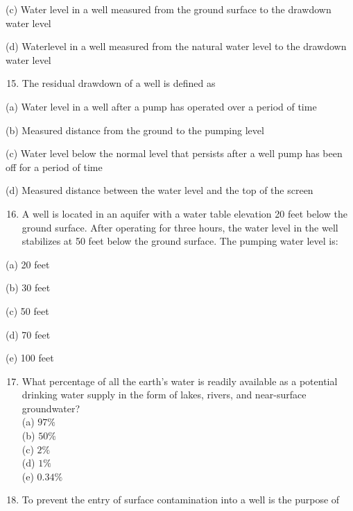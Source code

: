 \documentclass[10pt]{article}
\begin{document}
(c) Water level in a well measured from the ground surface to the drawdown water level

(d) Waterlevel in a well measured from the natural water level to the drawdown water level

\begin{enumerate}
  \setcounter{enumi}{14}
  \item The residual drawdown of a well is defined as
\end{enumerate}

(a) Water level in a well after a pump has operated over a period of time

(b) Measured distance from the ground to the pumping level

(c) Water level below the normal level that persists after a well pump has been off for a period of time

(d) Measured distance between the water level and the top of the screen

\begin{enumerate}
  \setcounter{enumi}{15}
  \item A well is located in an aquifer with a water table elevation 20 feet below the ground surface. After operating for three hours, the water level in the well stabilizes at 50 feet below the ground surface. The pumping water level is:
\end{enumerate}

(a) 20 feet

(b) 30 feet

(c) 50 feet

(d) 70 feet

(e) 100 feet

\begin{enumerate}
  \setcounter{enumi}{16}
  \item What percentage of all the earth's water is readily available as a potential drinking water supply in the form of lakes, rivers, and near-surface groundwater?\\
(a) $97 \%$\\
(b) $50 \%$\\
(c) $2 \%$\\
(d) $1 \%$\\
(e) $0.34 \%$\\

  \item To prevent the entry of surface contamination into a well is the purpose of

\end{enumerate}
\end{document}

